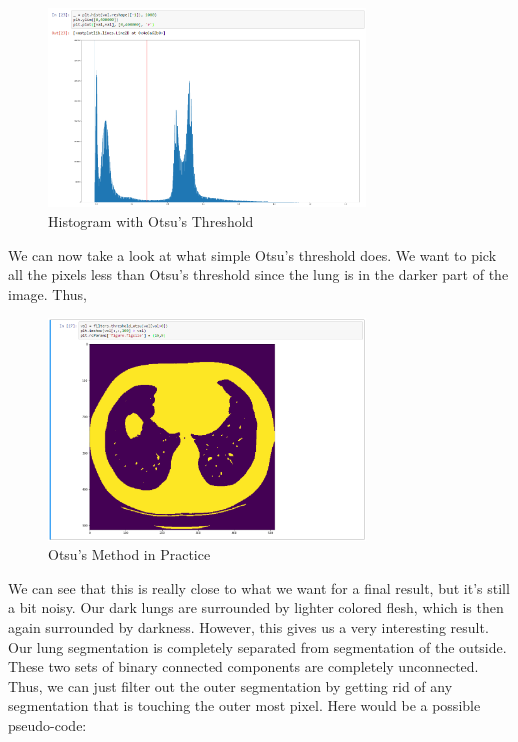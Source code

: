 \documentclass[10pt]{article}
\begin{document}
\begin{figure}[h]
	\centering
	\includegraphics[width = 0.75\textwidth]{figures/histWithThresh}
	\caption{Histogram with Otsu's Threshold}
	\label{fig:otsu}
\end{figure}
\clearpage
\indent We can now take a look at what simple Otsu's threshold does.  We want to pick all the pixels less than Otsu's threshold since the lung is in the darker part of the image.  Thus,
\begin{figure}[h]
	\centering
	\includegraphics[width = 0.75\textwidth]{figures/otsu}
	\caption{Otsu's Method in Practice}
	\label{fig:otsu2}
\end{figure}
We can see that this is really close to what we want for a final result, but it's still a bit noisy.  Our dark lungs are surrounded by lighter colored flesh, which is then again surrounded by darkness.  However, this gives us a very interesting result.  Our lung segmentation is completely separated from segmentation of the outside.  These two sets of binary connected components are completely unconnected.  Thus, we can just filter out the outer segmentation by getting rid of any segmentation that is touching the outer most pixel.  Here would be a possible pseudo-code:
\end{document}
